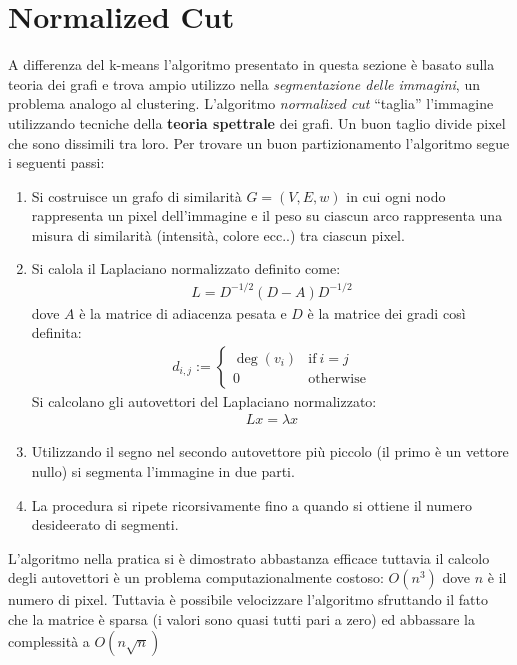 \section{Normalized Cut} %
\label{sec:normalized_cut}
A differenza del k-means l'algoritmo presentato in questa sezione è basato sulla teoria dei grafi e trova ampio utilizzo nella \emph{segmentazione delle immagini}, un problema analogo al clustering.
L'algoritmo \emph{normalized cut} “taglia” l'immagine utilizzando tecniche della \textbf{teoria spettrale} dei grafi. Un buon taglio divide pixel che sono dissimili tra loro. Per trovare un buon partizionamento l'algoritmo segue i seguenti passi:
\begin{enumerate}
	\item Si costruisce un grafo di similarità $G=(V, E, w)$ in cui ogni nodo rappresenta un pixel dell'immagine e il peso su ciascun arco rappresenta una misura di similarità (intensità, colore ecc..) tra ciascun pixel.
	\item Si calola il Laplaciano normalizzato definito come:
	\begin{align}
		L = D ^ {- 1 / 2} (D - A) D ^ {- 1 / 2}
	\end{align}
	dove $A$ è la matrice di adiacenza pesata e $D$ è la matrice dei gradi così definita:
	\begin{align}
		d_{i,j}:=
		\begin{cases} 
		\deg(v_i) & \mbox{if}\ i = j \\
		0 & \mbox{otherwise}
		\end{cases}
	\end{align}
	Si calcolano gli autovettori del Laplaciano normalizzato:
	\begin{align}
		L x = \lambda x
	\end{align}
	
	\item Utilizzando il segno nel secondo autovettore più piccolo (il primo è un vettore nullo) si segmenta l'immagine in due parti.

	\item La procedura si ripete ricorsivamente fino a quando si ottiene il numero desideerato di segmenti.
\end{enumerate}

L'algoritmo nella pratica si è dimostrato abbastanza efficace tuttavia il calcolo degli autovettori è un problema computazionalmente costoso: $O(n^3)$ dove $n$ è il numero di pixel. Tuttavia è possibile velocizzare l'algoritmo sfruttando il fatto che la matrice è sparsa (i valori sono quasi tutti pari a zero) ed abbassare la complessità a $O(n \sqrt{n})$\\


